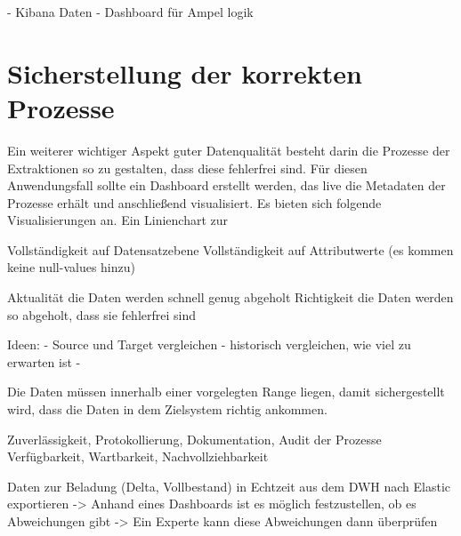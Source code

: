 - Kibana Daten
- Dashboard für Ampel logik

\section{Sicherstellung der korrekten Prozesse}
Ein weiterer wichtiger Aspekt guter Datenqualität besteht darin die Prozesse der Extraktionen so zu gestalten, dass diese fehlerfrei sind.
Für diesen Anwendungsfall sollte ein Dashboard erstellt werden, das live die Metadaten der Prozesse erhält und anschließend visualisiert.
Es bieten sich folgende Visualisierungen an.
Ein Linienchart zur 



Vollständigkeit auf Datensatzebene
Vollständigkeit auf Attributwerte (es kommen keine null-values hinzu)


Aktualität die Daten werden schnell genug abgeholt
Richtigkeit die Daten werden so abgeholt, dass sie fehlerfrei sind

Ideen:
- Source und Target vergleichen
- historisch vergleichen, wie viel zu erwarten ist
- 

Die Daten müssen innerhalb einer vorgelegten Range liegen, damit sichergestellt wird, dass die Daten in dem Zielsystem richtig ankommen.



Zuverlässigkeit, Protokollierung, Dokumentation, Audit der Prozesse
 Verfügbarkeit, Wartbarkeit, Nachvollziehbarkeit


Daten zur Beladung (Delta, Vollbestand) in Echtzeit aus dem DWH nach Elastic exportieren
-> Anhand eines Dashboards ist es möglich festzustellen, ob es Abweichungen gibt
-> Ein Experte kann diese Abweichungen dann überprüfen




